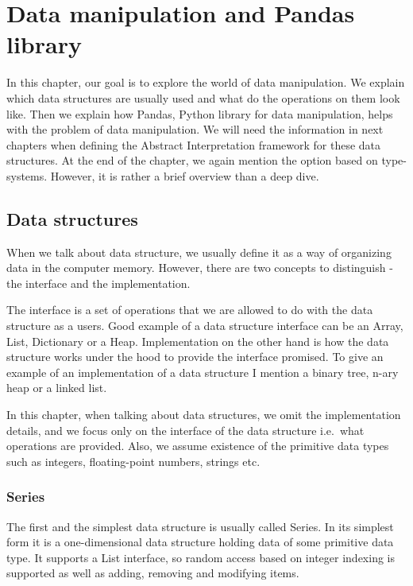 \chapter{Data manipulation and Pandas library}

In this chapter, our goal is to explore the world of data manipulation.
We explain which data structures are usually used and what do the operations on them look like.
Then we explain how Pandas, Python library for data manipulation, helps with the problem of data manipulation.
We will need the information in next chapters when defining the Abstract Interpretation framework for these data
structures.
At the end of the chapter, we again mention the option based on type-systems.
However, it is rather a brief overview than a deep dive.


\section{Data structures} %

When we talk about data structure, we usually define it as a way of organizing data in the computer memory.
However, there are two concepts to distinguish - the interface and the implementation.

The interface is a set of operations that we are allowed to do with the data structure as a users.
Good example of a data structure interface can be an Array, List, Dictionary or a Heap.
Implementation on the other hand is how the data structure works under the hood to provide the interface promised.
To give an example of an implementation of a data structure I mention a binary tree, n-ary heap or a linked list.

In this chapter, when talking about data structures, we omit the implementation details, and we focus only on the
interface of the data structure i.e.\ what operations are provided.
Also, we assume existence of the primitive data types such as integers, floating-point numbers, strings etc.


\subsection{Series}

The first and the simplest data structure is usually called Series.
In its simplest form it is a one-dimensional data structure holding data of some primitive data type.
It supports a List interface, so random access based on integer indexing is supported as well as adding, removing and
modifying items.

